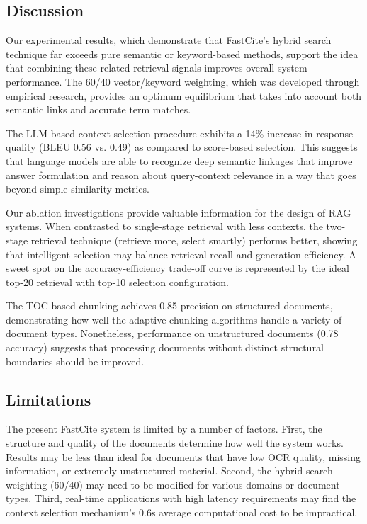\documentclass[runningheads]{llncs}
\begin{document}
\subsection{Discussion}

Our experimental results, which demonstrate that FastCite's hybrid search technique far exceeds pure semantic or keyword-based methods, support the idea that combining these related retrieval signals improves overall system performance. The 60/40 vector/keyword weighting, which was developed through empirical research, provides an optimum equilibrium that takes into account both semantic links and accurate term matches.

The LLM-based context selection procedure exhibits a 14\% increase in response quality (BLEU 0.56 vs. 0.49) as compared to score-based selection. This suggests that language models are able to recognize deep semantic linkages that improve answer formulation and reason about query-context relevance in a way that goes beyond simple similarity metrics.

Our ablation investigations provide valuable information for the design of RAG systems. When contrasted to single-stage retrieval with less contexts, the two-stage retrieval technique (retrieve more, select smartly) performs better, showing that intelligent selection may balance retrieval recall and generation efficiency. A sweet spot on the accuracy-efficiency trade-off curve is represented by the ideal top-20 retrieval with top-10 selection configuration.

The TOC-based chunking achieves 0.85 precision on structured documents, demonstrating how well the adaptive chunking algorithms handle a variety of document types. Nonetheless, performance on unstructured documents (0.78 accuracy) suggests that processing documents without distinct structural boundaries should be improved.

\subsection{Limitations}

The present FastCite system is limited by a number of factors. First, the structure and quality of the documents determine how well the system works. Results may be less than ideal for documents that have low OCR quality, missing information, or extremely unstructured material. Second, the hybrid search weighting (60/40) may need to be modified for various domains or document types. Third, real-time applications with high latency requirements may find the context selection mechanism's 0.6s average computational cost to be impractical.
\end{document}
